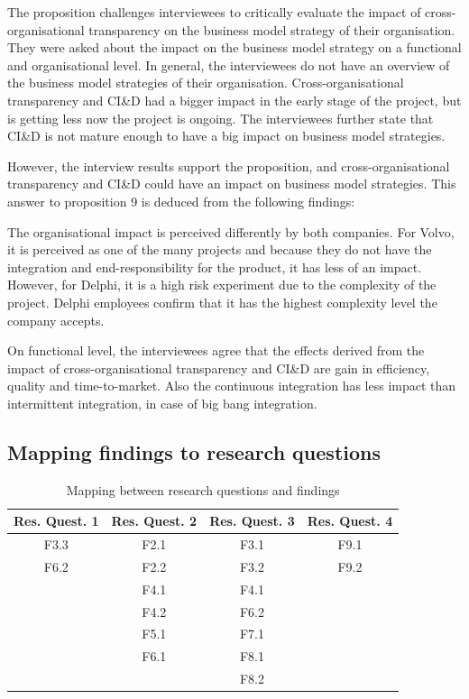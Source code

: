 The proposition challenges interviewees to critically evaluate the impact of cross-organisational transparency on the business model strategy of their organisation. They were asked about the impact on the business model strategy on a functional and organisational level. In general, the interviewees do not have an overview of the business model strategies of their organisation. Cross-organisational transparency and CI\&D had a bigger impact in the early stage of the project, but is getting less now the project is ongoing. The interviewees further state that CI\&D is not mature enough to have a big impact on business model strategies. 

However, the interview results support the proposition, and cross-organisational transparency and CI\&D could have an impact on business model strategies. This answer to proposition 9 is deduced from the following findings:

 The organisational impact is perceived differently by both companies. For Volvo, it is perceived as one of the many projects and because they do not have the integration and end-responsibility for the product, it has less of an impact. However, for Delphi, it is a high risk experiment due to the complexity of the project. Delphi employees confirm that it has the highest complexity level the company accepts.

 On functional level, the interviewees agree that the effects derived from the impact of cross-organisational transparency and CI\&D are gain in efficiency, quality and time-to-market. Also the continuous integration has less impact than intermittent integration, in case of big bang integration.  

\subsection{Mapping findings to research questions}\label{sec:findings_RQs}


\begin{table}[htb]
\centering
\begin{tabular}{|c|c|c|c|}\hline
{\bf Res. Quest. 1} & {\bf Res. Quest. 2} & {\bf Res. Quest. 3} & {\bf Res. Quest. 4}\\ \hline
F3.3 & F2.1 & F3.1 & F9.1\\ \hline
F6.2 & F2.2 & F3.2 & F9.2\\ \hline
		 & F4.1 & F4.1 &\\ \hline
		 & F4.2	& F6.2 &\\ \hline
		 & F5.1 & F7.1 &\\ \hline
		 & F6.1 & F8.1 &\\ \hline
		 & 			& F8.2 &\\ \hline		
\end{tabular}
\caption{Mapping between research questions and findings}
\label{tab:mapping}
\vspace{-.4cm}
\end{table}



